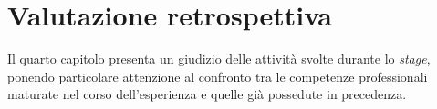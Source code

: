 \chapter{Valutazione retrospettiva}
\label{cap:valutazione-retrospettiva}
Il quarto capitolo presenta un giudizio delle attività svolte durante lo \textit{stage}, ponendo particolare attenzione al confronto tra le competenze professionali maturate nel corso dell'esperienza e quelle già possedute in precedenza.


